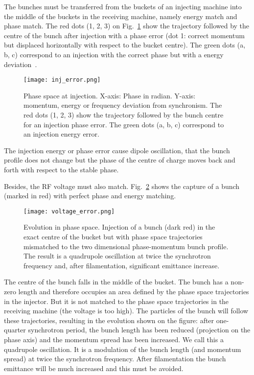 The bunches must be transferred from the buckets of an injecting machine into the middle of the buckets in the receiving machine, namely energy match and phase match. The red dots (1, 2, 3) on Fig.~\ref{inj_error} show the trajectory followed by the centre of the bunch after injection with a phase error (dot 1: correct momentum but displaced horizontally with respect to the bucket centre). The green dots (a, b, c) correspond to an injection with the correct phase but with a energy deviation~\cite{baudrenghien_low-level_2010}. 
\begin{figure}[!htb]
   \centering   
   \texttt{[image: inj\_error.png]}
   \caption{Phase space at injection. X-axis: Phase in radian. Y-axis: momentum, energy or frequency deviation
from synchronism. The red dots (1, 2, 3) show the trajectory followed by the bunch centre for an injection phase error. The green dots (a, b, c) correspond to an injection energy error.~\cite{baudrenghien_low-level_2010}}
   \label{inj_error}
\end{figure}

The injection energy or phase error cause dipole oscillation, that the bunch profile does not change but the phase of the centre of charge moves back and forth with respect to the stable phase. 

Besides, the RF voltage must also match. Fig.~\ref{voltage_error} shows the capture of a bunch (marked in red) with perfect phase and energy matching. 
\begin{figure}[H]
   \centering   
   \texttt{[image: voltage\_error.png]}
   \caption{Evolution in phase space. Injection of a bunch (dark red) in the exact centre of the bucket but with phase space trajectories mismatched to the two dimensional phase-momentum bunch profile. The result is a quadrupole oscillation at twice the synchrotron frequency and, after filamentation, significant emittance increase.~\cite{baudrenghien_low-level_2010}}
   \label{voltage_error}
\end{figure}

The centre of the bunch falls in the middle of the bucket. The bunch has a non-zero length and therefore occupies an area defined by the
phase space trajectories in the injector. But it is not matched to the phase space trajectories in the receiving machine (the voltage is too high). The particles of the bunch will follow these trajectories, resulting in the evolution shown on the figure: after one-quarter synchrotron period, the bunch length has been reduced (projection on the phase axis) and the momentum spread has been increased. We call
this a quadrupole oscillation. It is a modulation of the bunch length (and momentum spread) at twice the synchrotron frequency. After filamentation the bunch emittance will be much increased and this must be avoided.~\cite{baudrenghien_low-level_2010}



